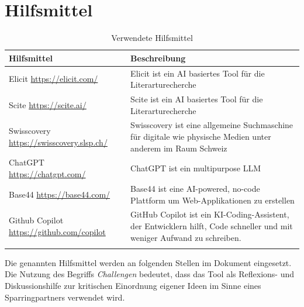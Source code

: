 \section{Hilfsmittel}
\label{sec:hilfsmittel}

\begin{longtable}{|
  p{\dimexpr(\textwidth-4\tabcolsep-3\arrayrulewidth)/2\relax}|
  p{\dimexpr(\textwidth-4\tabcolsep-3\arrayrulewidth)/2\relax}|
}
    \hline
    \textbf{Hilfsmittel} & \textbf{Beschreibung} \\
    \hline
    \endfirsthead

    Elicit \url{https://elicit.com/} & Elicit ist ein AI basiertes Tool für die Literarturecherche
    \\
    \hline
    
    Scite \url{https://scite.ai/} & Scite ist ein AI basiertes Tool für die Literarturecherche
    \\
    \hline
    
    Swisscovery \url{https://swisscovery.slsp.ch/} & Swisscovery ist eine allgemeine Suchmaschine für digitale wie physische Medien unter anderem im Raum Schweiz 
    \\
    \hline
    
    ChatGPT \url{https://chatgpt.com/} & ChatGPT ist ein multipurpose LLM
    \\
    \hline

    Base44 \url{https://base44.com/} & Base44 ist eine AI-powered, no-code Plattform um Web-Applikationen zu erstellen
    \\
    \hline
    
    Github Copilot \url{https://github.com/copilot} & GitHub Copilot ist ein KI-Coding-Assistent, der Entwicklern hilft, Code schneller und mit weniger Aufwand zu schreiben.
    \\
    \hline

    \caption{Verwendete Hilfsmittel}
    \label{tab:support-tools}
\end{longtable}

Die genannten Hilfsmittel werden an folgenden Stellen im Dokument eingesetzt. Die Nutzung des Begriffs \textit{Challengen} bedeutet, dass das Tool als Reflexions- und Diskussionshilfe zur kritischen Einordnung eigener Ideen im Sinne eines Sparringpartners verwendet wird.

